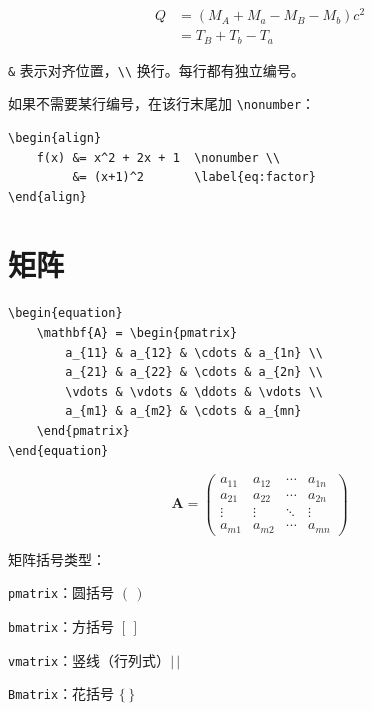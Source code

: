 \begin{align}
    Q &= (M_A + M_a - M_B - M_b)c^2  \label{eq:q_value} \\
      &= T_B + T_b - T_a              \label{eq:q_kinetic}
\end{align}

\verb|&| 表示对齐位置，\verb|\\| 换行。每行都有独立编号。

如果不需要某行编号，在该行末尾加 \verb|\nonumber|：
\begin{verbatim}
\begin{align}
    f(x) &= x^2 + 2x + 1  \nonumber \\
         &= (x+1)^2       \label{eq:factor}
\end{align}
\end{verbatim}

\section{矩阵}

\begin{verbatim}
\begin{equation}
    \mathbf{A} = \begin{pmatrix}
        a_{11} & a_{12} & \cdots & a_{1n} \\
        a_{21} & a_{22} & \cdots & a_{2n} \\
        \vdots & \vdots & \ddots & \vdots \\
        a_{m1} & a_{m2} & \cdots & a_{mn}
    \end{pmatrix}
\end{equation}
\end{verbatim}

\begin{equation}
    \mathbf{A} = \begin{pmatrix}
        a_{11} & a_{12} & \cdots & a_{1n} \\
        a_{21} & a_{22} & \cdots & a_{2n} \\
        \vdots & \vdots & \ddots & \vdots \\
        a_{m1} & a_{m2} & \cdots & a_{mn}
    \end{pmatrix}
\end{equation}

矩阵括号类型：
\begin{compactitem}
    \item \texttt{pmatrix}：圆括号 $(\,)$
    \item \texttt{bmatrix}：方括号 $[\,]$
    \item \texttt{vmatrix}：竖线（行列式）$|\,|$
    \item \texttt{Bmatrix}：花括号 $\{\,\}$
\end{compactitem}

